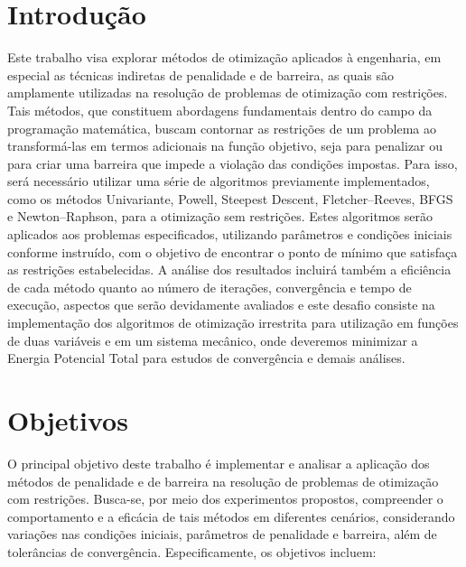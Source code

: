 \documentclass[a4paper, 12pt]{article}
\begin{document}
\newpage


\newpage

\listoffigures
\thispagestyle{empty}

\newpage

\newpage

\thispagestyle{empty}

\newpage

\section{Introdução}
Este trabalho visa explorar métodos de otimização aplicados à engenharia, em especial as técnicas indiretas de penalidade e de barreira, as quais são amplamente utilizadas na resolução de problemas de otimização com restrições. Tais métodos, que constituem abordagens fundamentais dentro do campo da programação matemática, buscam contornar as restrições de um problema ao transformá-las em termos adicionais na função objetivo, seja para penalizar ou para criar uma barreira que impede a violação das condições impostas. Para isso, será necessário utilizar uma série de algoritmos previamente implementados, como os métodos Univariante, Powell, Steepest Descent, Fletcher–Reeves, BFGS e Newton–Raphson, para a otimização sem restrições. Estes algoritmos serão aplicados aos problemas especificados, utilizando parâmetros e condições iniciais conforme instruído, com o objetivo de encontrar o ponto de mínimo que satisfaça as restrições estabelecidas. A análise dos resultados incluirá também a eficiência de cada método quanto ao número de iterações, convergência e tempo de execução, aspectos que serão devidamente avaliados e este desafio consiste na implementação dos algoritmos de otimização irrestrita para utilização em funções de duas variáveis e em um sistema mecânico, onde deveremos minimizar a Energia Potencial Total para estudos de convergência e demais análises.

\newpage
\section{Objetivos}
O principal objetivo deste trabalho é implementar e analisar a aplicação dos métodos de penalidade e de barreira na resolução de problemas de otimização com restrições. Busca-se, por meio dos experimentos propostos, compreender o comportamento e a eficácia de tais métodos em diferentes cenários, considerando variações nas condições iniciais, parâmetros de penalidade e barreira, além de tolerâncias de convergência. Especificamente, os objetivos incluem:
\end{document}
